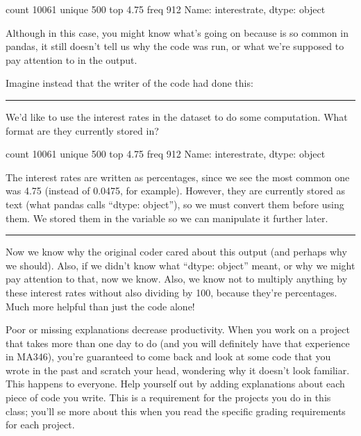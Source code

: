 \documentclass[letterpaper,10pt,english]{sphinxmanual}
\begin{document}
\begin{sphinxVerbatim}[commandchars=\\\{\}]
count     10061
unique      500
top        4.75
freq        912
Name: interest\PYGZus{}rate, dtype: object
\end{sphinxVerbatim}

Although in this case, you might know what’s going on because  is so common in pandas, it still doesn’t tell us why the code was run, or what we’re supposed to pay attention to in the output.

Imagine instead that the writer of the code had done this:


\bigskip\hrule\bigskip


We’d like to use the interest rates in the dataset to do some computation.  What format are they currently stored in?

\begin{sphinxVerbatim}[commandchars=\\\{\}]
  \PYG{p}{[}\PYG{p}{]}
\end{sphinxVerbatim}

\begin{sphinxVerbatim}[commandchars=\\\{\}]
count     10061
unique      500
top        4.75
freq        912
Name: interest\PYGZus{}rate, dtype: object
\end{sphinxVerbatim}

The interest rates are written as percentages, since we see the most common one was 4.75 (instead of 0.0475, for example).  However, they are currently stored as text (what pandas calls “dtype: object”), so we must convert them before using them.  We stored them in the  variable so we can manipulate it further later.


\bigskip\hrule\bigskip


Now we know why the original coder cared about this output (and perhaps why we should).  Also, if we didn’t know what “dtype: object” meant, or why we might pay attention to that, now we know.  Also, we know not to multiply anything by these interest rates without also dividing by 100, because they’re percentages.  Much more helpful than just the code alone!

Poor or missing explanations decrease productivity.  When you work on a project that takes more than one day to do (and you will definitely have that experience in MA346), you’re guaranteed to come back and look at some code that you wrote in the past and scratch your head, wondering why it doesn’t look familiar.  This happens to everyone.  Help yourself out by adding explanations about each piece of code you write.  This is a requirement for the projects you do in this class; you’ll se more about this when you read the specific grading requirements for each project.
\end{document}
